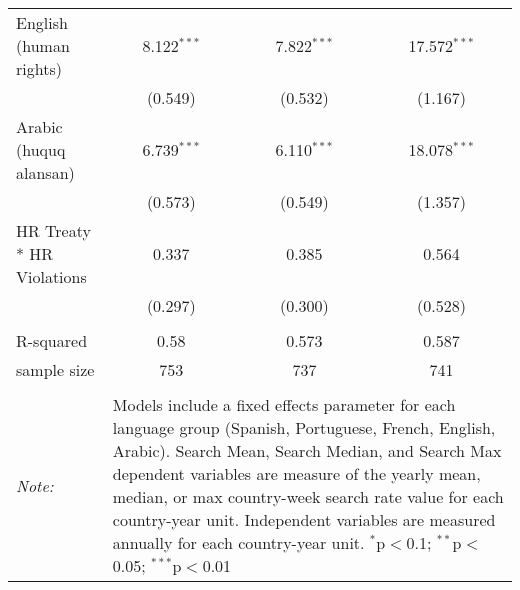\begin{table}[!htbp]
\begin{tabular}{@{\extracolsep{5pt}}lccc}
  English (human rights) & 8.122$^{***}$ & 7.822$^{***}$ & 17.572$^{***}$ \\ 
  & (0.549) & (0.532) & (1.167) \\ 
  Arabic (huquq alansan) & 6.739$^{***}$ & 6.110$^{***}$ & 18.078$^{***}$ \\ 
  & (0.573) & (0.549) & (1.357) \\ 
  HR Treaty * HR Violations & 0.337 & 0.385 & 0.564 \\ 
  & (0.297) & (0.300) & (0.528) \\ 
 \hline \\[-1.8ex] 
R-squared  & 0.58 & 0.573 & 0.587 \\ 
sample size  & 753 & 737 & 741 \\ 
\hline 
\hline \\[-1.8ex] 
\textit{Note:}  & \multicolumn{3}{l}{\parbox[t]{8cm}{Models include a fixed effects parameter for each language group (Spanish, Portuguese, French, English, Arabic). Search Mean, Search Median, and Search Max dependent variables are measure of the yearly mean, median, or max country-week search rate value for each country-year unit. Independent variables are measured annually for each country-year unit. $^{*}$p$<$0.1; $^{**}$p$<$0.05; $^{***}$p$<$0.01}} \\ 
\end{tabular} 
\end{table} 
